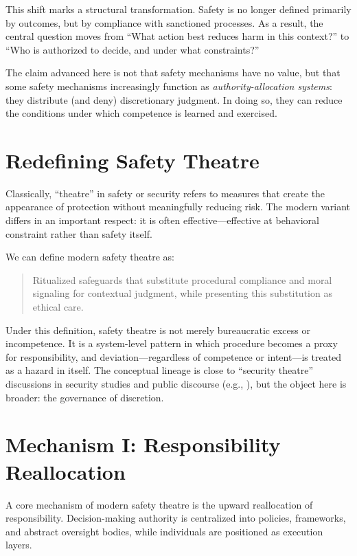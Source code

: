 \documentclass[11pt]{article}
\begin{document}
This shift marks a structural transformation. Safety is no longer defined primarily by
outcomes, but by compliance with sanctioned processes. As a result, the central
question moves from ``What action best reduces harm in this context?'' to ``Who is
authorized to decide, and under what constraints?''

The claim advanced here is not that safety mechanisms have no value, but that some
safety mechanisms increasingly function as \emph{authority-allocation systems}: they
distribute (and deny) discretionary judgment. In doing so, they can reduce the
conditions under which competence is learned and exercised.

\section{Redefining Safety Theatre}

Classically, ``theatre'' in safety or security refers to measures that create the
appearance of protection without meaningfully reducing risk. The modern variant
differs in an important respect: it is often effective---effective at behavioral
constraint rather than safety itself.

We can define modern safety theatre as:

\begin{quote}
Ritualized safeguards that substitute procedural compliance and moral signaling for
contextual judgment, while presenting this substitution as ethical care.
\end{quote}

Under this definition, safety theatre is not merely bureaucratic excess or
incompetence. It is a system-level pattern in which procedure becomes a proxy for
responsibility, and deviation---regardless of competence or intent---is treated as a
hazard in itself. The conceptual lineage is close to ``security theatre'' discussions
in security studies and public discourse (e.g., \citet{Schneier2003BeyondFear}), but the
object here is broader: the governance of discretion.

\section{Mechanism I: Responsibility Reallocation}

A core mechanism of modern safety theatre is the upward reallocation of responsibility.
Decision-making authority is centralized into policies, frameworks, and abstract
oversight bodies, while individuals are positioned as execution layers.
\end{document}
